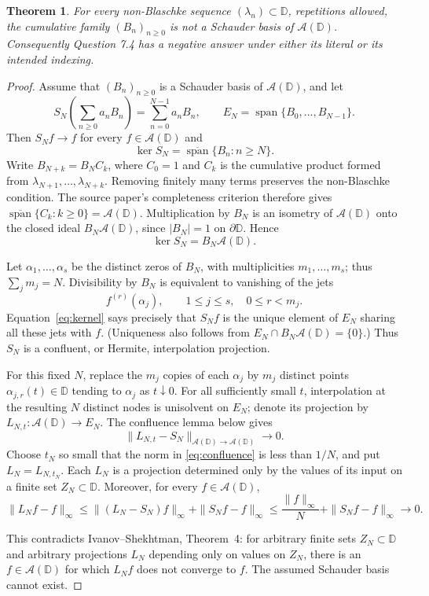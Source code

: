 \documentclass[10pt]{article}
\newtheorem*{theorem}{Theorem}
\newcommand{\A}{\mathcal A(\mathbb D)}
\newcommand{\D}{\mathbb D}
\newcommand{\spn}{\operatorname{span}}
\begin{document}
\begin{theorem}
For every non-Blaschke sequence $(\lambda_n)\subset\D$, repetitions allowed,
the cumulative family $(B_n)_{n\ge0}$ is not a Schauder basis of $\A$.
Consequently Question 7.4 has a negative answer under either its literal or
its intended indexing.
\end{theorem}

\begin{proof}
Assume that $(B_n)_{n\ge0}$ is a Schauder basis of $\A$, and let
\[
 S_N\!\left(\sum_{n\ge0}a_nB_n\right)=\sum_{n=0}^{N-1}a_nB_n,
 \qquad E_N=\spn\{B_0,\ldots,B_{N-1}\}.
\]
Then $S_Nf\to f$ for every $f\in\A$ and
\[
 \ker S_N=\overline{\spn}\{B_n:n\ge N\}.
\]
Write $B_{N+k}=B_NC_k$, where $C_0=1$ and $C_k$ is the cumulative product
formed from $\lambda_{N+1},\ldots,\lambda_{N+k}$.  Removing finitely many
terms preserves the non-Blaschke condition.  The source paper's completeness
criterion therefore gives
$\overline{\spn}\{C_k:k\ge0\}=\A$.  Multiplication by $B_N$ is an isometry
of $\A$ onto the closed ideal $B_N\A$, since $|B_N|=1$ on $\partial\D$.
Hence
\begin{equation}\label{eq:kernel}
 \ker S_N=B_N\A.
\end{equation}

Let $\alpha_1,\ldots,\alpha_s$ be the distinct zeros of $B_N$, with
multiplicities $m_1,\ldots,m_s$; thus $\sum_jm_j=N$.  Divisibility by $B_N$
is equivalent to vanishing of the jets
\[
 f^{(r)}(\alpha_j),\qquad 1\le j\le s,\quad 0\le r<m_j.
\]
Equation~\eqref{eq:kernel} says precisely that $S_Nf$ is the unique element of
$E_N$ sharing all these jets with $f$.  (Uniqueness also follows from
$E_N\cap B_N\A=\{0\}$.)  Thus $S_N$ is a confluent, or Hermite,
interpolation projection.

For this fixed $N$, replace the $m_j$ copies of each $\alpha_j$ by $m_j$
distinct points $\alpha_{j,r}(t)\in\D$ tending to $\alpha_j$ as $t\downarrow0$.
For all sufficiently small $t$, interpolation at the resulting $N$ distinct
nodes is unisolvent on $E_N$; denote its projection by $L_{N,t}:\A\to E_N$.
The confluence lemma below gives
\begin{equation}\label{eq:confluence}
 \|L_{N,t}-S_N\|_{\A\to\A}\longrightarrow0.
\end{equation}
Choose $t_N$ so small that the norm in \eqref{eq:confluence} is less than
$1/N$, and put $L_N=L_{N,t_N}$.  Each $L_N$ is a projection determined only
by the values of its input on a finite set $Z_N\subset\D$.  Moreover, for
every $f\in\A$,
\[
 \|L_Nf-f\|_\infty
 \le \|(L_N-S_N)f\|_\infty+\|S_Nf-f\|_\infty
 \le \frac{\|f\|_\infty}{N}+\|S_Nf-f\|_\infty\longrightarrow0.
\]

This contradicts Ivanov--Shekhtman, Theorem~4: for arbitrary finite sets
$Z_N\subset\D$ and arbitrary projections $L_N$ depending only on values on
$Z_N$, there is an $f\in\A$ for which $L_Nf$ does not converge to $f$.
The assumed Schauder basis cannot exist.
\end{proof}
\end{document}
